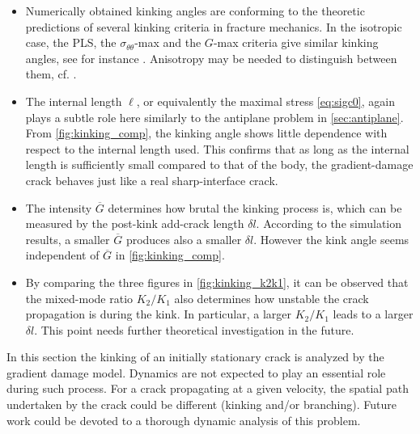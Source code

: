 \begin{itemize}
\item Numerically obtained kinking angles are conforming to the theoretic predictions of several kinking criteria in fracture mechanics. In the isotropic case, the PLS, the $\sigma_{\theta\theta}$-max and the $G$-max criteria give similar kinking angles, see for instance \cite{ChambolleFrancfortMarigo:2009}. Anisotropy may be needed to distinguish between them, cf. \cite{HakimKarma:2005}.

\item The internal length $\ell$, or equivalently the maximal stress \eqref{eq:sigc0}, again plays a subtle role here similarly to the antiplane problem in \cref{sec:antiplane}. From \cref{fig:kinking_comp}, the kinking angle shows little dependence with respect to the internal length used. This confirms that as long as the internal length is sufficiently small compared to that of the body, the gradient-damage crack behaves just like a real sharp-interface crack.

\item The intensity $\overline{G}$ determines how brutal the kinking process is, which can be measured by the post-kink add-crack length $\delta l$. According to the simulation results, a smaller $\overline{G}$ produces also a smaller $\delta l$. However the kink angle seems independent of $\overline{G}$ in \cref{fig:kinking_comp}.

\item By comparing the three figures in \eqref{fig:kinking_k2k1}, it can be observed that the mixed-mode ratio $K_2/K_1$ also determines how unstable the crack propagation is during the kink. In particular, a larger $K_2/K_1$ leads to a larger $\delta l$. This point needs further theoretical investigation in the future.
\end{itemize}

In this section the kinking of an initially stationary crack is analyzed by the gradient damage model. Dynamics are not expected to play an essential role during such process. For a crack propagating at a given velocity, the spatial path undertaken by the crack could be different (kinking and/or branching). Future work could be devoted to a thorough dynamic analysis of this problem.

